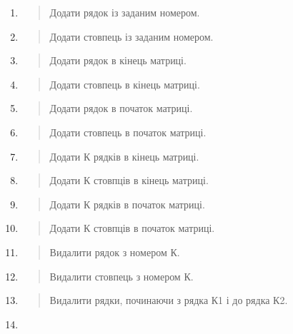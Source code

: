 \documentclass[]{article}
\begin{document}
\begin{enumerate}
\def\labelenumi{\arabic{enumi})}
\item
  \begin{quote}
  Додати рядок із заданим номером.
  \end{quote}
\item
  \begin{quote}
  Додати стовпець із заданим номером.
  \end{quote}
\item
  \begin{quote}
  Додати рядок в кінець матриці.
  \end{quote}
\item
  \begin{quote}
  Додати стовпець в кінець матриці.
  \end{quote}
\item
  \begin{quote}
  Додати рядок в початок матриці.
  \end{quote}
\item
  \begin{quote}
  Додати стовпець в початок матриці.
  \end{quote}
\item
  \begin{quote}
  Додати К рядків в кінець матриці.
  \end{quote}
\item
  \begin{quote}
  Додати К стовпців в кінець матриці.
  \end{quote}
\item
  \begin{quote}
  Додати К рядків в початок матриці.
  \end{quote}
\item
  \begin{quote}
  Додати К стовпців в початок матриці.
  \end{quote}
\item
  \begin{quote}
  Видалити рядок з номером К.
  \end{quote}
\item
  \begin{quote}
  Видалити стовпець з номером К.
  \end{quote}
\item
  \begin{quote}
  Видалити рядки, починаючи з рядка К1 і до рядка К2.
  \end{quote}
\item

\end{enumerate}
\end{document}
